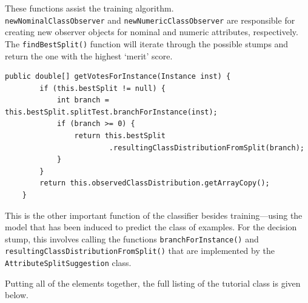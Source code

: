 \documentclass[a4paper,12pt,twoside]{book}
\begin{document}
These functions assist the training algorithm. \\ \verb+newNominalClassObserver+ and \verb+newNumericClassObserver+ are responsible for creating new observer objects for nominal and numeric attributes, respectively. The \verb+findBestSplit()+ function will iterate through the possible stumps and return the one with the highest `merit' score.

\begin{lstlisting}[caption={Predicting class of unknown examples},label=lst:test,firstnumber=68]
	public double[] getVotesForInstance(Instance inst) {
		if (this.bestSplit != null) {
			int branch = this.bestSplit.splitTest.branchForInstance(inst);
			if (branch >= 0) {
				return this.bestSplit
						.resultingClassDistributionFromSplit(branch);
			}
		}
		return this.observedClassDistribution.getArrayCopy();
	}
\end{lstlisting}

This is the other important function of the classifier besides training---using the model that has been induced to predict the class of examples. For the decision stump, this involves calling the functions \verb+branchForInstance()+ and \verb+resultingClassDistributionFromSplit()+ that are implemented by the \verb+AttributeSplitSuggestion+ class.

Putting all of the elements together, the full listing of the tutorial class is given below.
\end{document}
